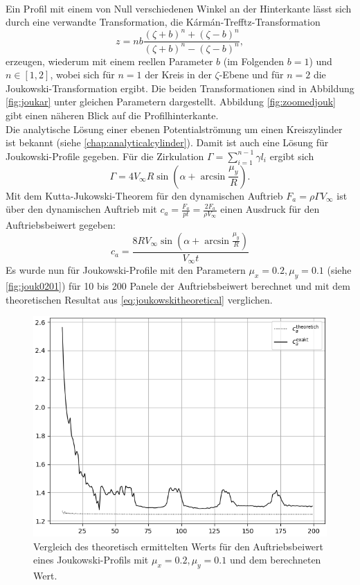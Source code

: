 \\
Ein Profil mit einem von Null verschiedenen Winkel an der Hinterkante lässt sich durch eine verwandte Transformation, die Kármán-Trefftz-Transformation
\begin{equation}
z=nb{\frac {(\zeta +b)^{n}+(\zeta -b)^{n}}{(\zeta +b)^{n}-(\zeta -b)^{n}}},
\end{equation}
erzeugen, wiederum mit einem reellen Parameter $b$ (im Folgenden $b=1$) und $n \in [1,2]$, wobei sich für $n=1$ der Kreis in der $\zeta$-Ebene und für $n=2$ die Joukowski-Transformation ergibt. Die beiden Transformationen sind in Abbildung \ref{fig:joukar} unter gleichen Parametern dargestellt. Abbildung \ref{fig:zoomedjouk} gibt einen näheren Blick auf die Profilhinterkante. \\
Die analytische Lösung einer ebenen Potentialströmung um einen Kreiszylinder ist bekannt (siehe \ref{chap:analyticalcylinder}). Damit ist auch eine Lösung für Joukowski-Profile gegeben. Für die Zirkulation $\Gamma = \sum_{i=1}^{n-1} \gamma l_i$ ergibt sich
\begin{equation}
\Gamma = 4  V_{\infty}R \sin{\left(\alpha + \arcsin \frac{\mu_y}{R} \right)}.
\end{equation}
Mit dem Kutta-Jukowski-Theorem für den dynamischen Auftrieb $F_a = \rho \Gamma V_{\infty}$ ist über den dynamischen Auftrieb mit $c_a = \tfrac{F_a}{pt} = \tfrac{2F_a}{\rho V_{\infty}}$ einen Ausdruck für den Auftriebsbeiwert gegeben:
\begin{equation}
\label{eq:joukowskitheoretical}
c_a = \frac{8  R V_{\infty} \sin{\left(\alpha + \arcsin \frac{\mu_y}{R} \right)}}{V_{\infty}t}
\end{equation} 
Es wurde nun für Joukowski-Profile mit den Parametern $\mu_x = 0.2, \mu_y =0.1$ (siehe \ref{fig:jouk0201}) für 10 bis 200 Panele der Auftriebsbeiwert berechnet und mit dem theoretischen Resultat aus \eqref{eq:joukowskitheoretical} verglichen. 
\begin{figure}[!ht]
\begin{center} \includegraphics[scale=0.5]{figures/joukowskitheoretical.png} \end{center}
\caption{Vergleich des theoretisch ermittelten Werts für den Auftriebsbeiwert eines Joukowski-Profils mit $\mu_x = 0.2, \mu_y =0.1$ und dem berechneten Wert.}
\label{fig:joukowskitheoretical}
\end{figure}
